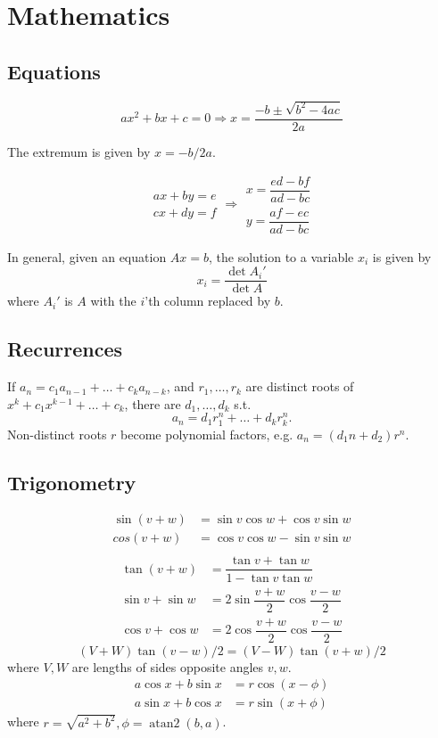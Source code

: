 
\chapter{Mathematics}

\section{Equations}
\[ax^2+bx+c=0 \Rightarrow x = \frac{-b\pm\sqrt{b^2-4ac}}{2a}\]

The extremum is given by $x = -b/2a$.

\[\begin{aligned}ax+by=e\\cx+dy=f\end{aligned}
	\Rightarrow
	\begin{aligned}x=\dfrac{ed-bf}{ad-bc}\\y=\dfrac{af-ec}{ad-bc}\end{aligned}\]
							
	In general, given an equation $Ax = b$, the solution to a variable $x_i$ is given by
	\[x_i = \frac{\det A_i'}{\det A} \]
	where $A_i'$ is $A$ with the $i$'th column replaced by $b$.
							
	\section{Recurrences}
	If $a_n = c_1 a_{n-1} + \dots + c_k a_{n-k}$, and $r_1, \dots, r_k$ are distinct roots of $x^k + c_1 x^{k-1} + \dots + c_k$, there are $d_1, \dots, d_k$ s.t.
	\[a_n = d_1r_1^n + \dots + d_kr_k^n. \]
	Non-distinct roots $r$ become polynomial factors, e.g. $a_n = (d_1n + d_2)r^n$.
							
	\section{Trigonometry}
	\begin{align*}
		\sin(v+w) & {}=\sin v\cos w+\cos v\sin w \\
		cos(v+w)  & {}=\cos v\cos w-\sin v\sin w \\
	\end{align*}
	\begin{align*}
		\tan(v+w)     & {}=\dfrac{\tan v+\tan w}{1-\tan v\tan w} \\
		\sin v+\sin w & {}=2\sin\dfrac{v+w}{2}\cos\dfrac{v-w}{2} \\
		\cos v+\cos w & {}=2\cos\dfrac{v+w}{2}\cos\dfrac{v-w}{2} 
	\end{align*}
	\[ (V+W)\tan(v-w)/2{}=(V-W)\tan(v+w)/2 \]
	where $V, W$ are lengths of sides opposite angles $v, w$.
	\begin{align*}
		a\cos x+b\sin x & =r\cos(x-\phi) \\
		a\sin x+b\cos x & =r\sin(x+\phi) 
	\end{align*}
	where $r=\sqrt{a^2+b^2}, \phi=\operatorname{atan2}(b,a)$.
							
